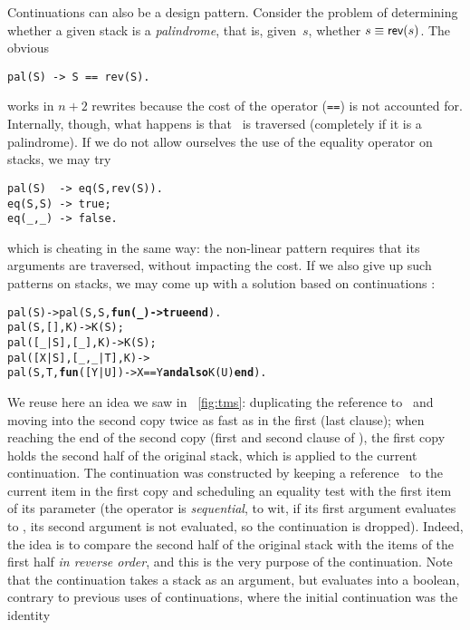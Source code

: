 Continuations can also be a design pattern. Consider the problem of
determining whether a given stack is a
\emph{palindrome}, that is, given~\(s\), whether
\(s \equiv \textsf{rev}(s)\). The obvious
\begin{verbatim}
pal(S) -> S == rev(S).
\end{verbatim}
works in \(n+2\) rewrites because the cost of the operator
(\texttt{==}) is not accounted for. Internally, though, what happens
is that ~is traversed (completely if it is a
palindrome). If we do not allow ourselves the use of the equality
operator on stacks, we may try
\begin{verbatim}
pal(S)  -> eq(S,rev(S)).
eq(S,S) -> true;
eq(_,_) -> false.
\end{verbatim}
which is cheating in the same way: the non\hyp{}linear pattern
  requires that its arguments are traversed, without impacting
the cost. If we also give up such patterns on stacks, we may come up
with a solution based on continuations \citep{DanvyGoldberg_2001}:
\begin{alltt}
pal(S)               -> pal(S,S,\textbf{fun(\_) -> true end}).
pal(    S,     [],K) -> K(S);\hfill% \emph{Even length}
pal([\_|S],    [\_],K) -> K(S);\hfill% \emph{Odd length}
pal([X|S],[\_,\_|T],K) -> 
\hfill{}pal(S,T,\textbf{fun}([Y|U]) -> X == Y \textbf{andalso} K(U) \textbf{end}).
\end{alltt}
We reuse here an idea we saw in \fig~\vref{fig:tms}: duplicating the
reference to~ and moving into the second copy twice as fast
as in the first (last clause); when reaching the end of the second
copy (first and second clause of ), the first copy
holds the second half of the original stack, which is applied to the
current continuation. The continuation was constructed by keeping a
reference~ to the current item in the first copy and
scheduling an equality test with the first item of its parameter (the
operator  is \emph{sequential}, to wit, if its first
argument evaluates to , its second argument is not
evaluated, so the continuation is dropped). Indeed, the idea is to
compare the second half of the original stack with the items of the
first half \emph{in reverse order}, and this is the very purpose of
the continuation. Note that the continuation takes a stack as an
argument, but evaluates into a boolean, contrary to previous uses of
continuations, where the initial continuation was the identity
